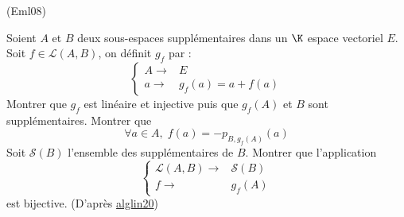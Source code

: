\begin{tiny}(Eml08)\end{tiny}
Soient $A$ et $B$ deux sous-espaces supplémentaires dans un $\K$ espace vectoriel $E$. Soit $f\in \mathcal L(A,B)$, on définit $g_f$ par :
\begin{displaymath}
 \left\lbrace 
\begin{aligned}
 A\rightarrow& E \\
a\rightarrow& g_f(a)=a+f(a)
\end{aligned}
\right. 
\end{displaymath}
Montrer que $g_f$ est linéaire et injective puis que $g_f(A)$ et $B$ sont supplémentaires. Montrer que
\begin{displaymath}
\forall a\in A,\; f(a) = -p_{B,g_f(A)}(a)
\end{displaymath}
Soit $\mathcal S(B)$ l'ensemble des supplémentaires de $B$. Montrer que l'application
\begin{displaymath}
\left\lbrace 
\begin{aligned}
 \mathcal L(A,B) \rightarrow& \mathcal S(B)\\
 f \rightarrow& g_f(A) 
\end{aligned}
\right. 
\end{displaymath}
est bijective. (D'après \href{http://back.maquisdoc.net/data/devoirs_nicolair/Aalglin20.pdf}{alglin20})